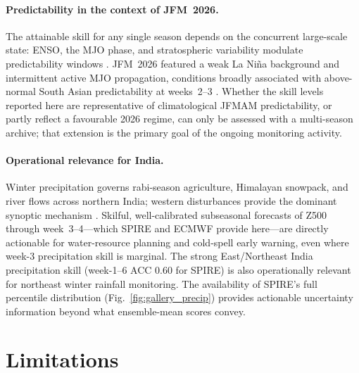 \documentclass[11pt,a4paper]{article}
\begin{document}
\paragraph{Predictability in the context of JFM~2026.}
The attainable skill for any single season depends on the concurrent
large-scale state: ENSO, the MJO phase, and stratospheric variability
modulate predictability windows
\citep{mariotti2020,domeisen2022,wheelerhendon2004,zhang2005}. JFM~2026
featured a weak La Ni\~na background and intermittent active MJO
propagation, conditions broadly associated with above-normal South Asian
predictability at weeks~2--3 \citep{deandrade2019}. Whether the skill
levels reported here are representative of climatological JFMAM
predictability, or partly reflect a favourable 2026 regime, can only be
assessed with a multi-season archive; that extension is the primary goal
of the ongoing monitoring activity.

\paragraph{Operational relevance for India.}
Winter precipitation governs rabi-season agriculture, Himalayan
snowpack, and river flows across northern India; western disturbances
provide the dominant synoptic mechanism
\citep{dimri2015,hunt2018,rao2019}. Skilful, well-calibrated subseasonal
forecasts of Z500 through week~3--4---which SPIRE and ECMWF provide
here---are directly actionable for water-resource planning and
cold-spell early warning, even where week-3 precipitation skill is
marginal. The strong East/Northeast India precipitation skill
(week-1--6 ACC 0.60 for SPIRE) is also operationally relevant for
northeast winter rainfall monitoring. The availability of SPIRE's full
percentile distribution (Fig.~\ref{fig:gallery_precip}) provides
actionable uncertainty information beyond what ensemble-mean scores
convey.

\section{Limitations}\label{sec:limitations}
\end{document}
